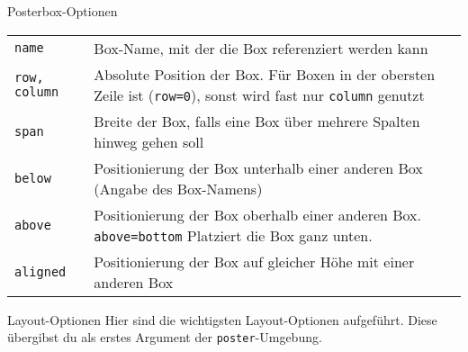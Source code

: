 \documentclass[
  a0paper,
  portrait,
  fontscale=.35 %
  ]{baposterrptu}
\begin{document}
\begin{poster}
\begin{posterbox}[below=poster-optionen, column=0]{Posterbox-Optionen}
    \begin{center}
      \begin{tabular}{lp{}}
        \lstinline!name!        & Box-Name, mit der die Box referenziert werden kann                                                                                 \\
        \lstinline!row, column! & Absolute Position der Box. Für Boxen in der obersten Zeile ist (\lstinline!row=0!), sonst wird fast nur \lstinline!column! genutzt \\
        \lstinline!span!        & Breite der Box, falls eine Box über mehrere Spalten hinweg gehen soll                                                              \\
        \lstinline!below!       & Positionierung der Box unterhalb einer anderen Box (Angabe des Box-Namens)                                                         \\
        \lstinline!above!       & Positionierung der Box oberhalb einer anderen Box. \lstinline!above=bottom! Platziert die Box ganz unten.                          \\
        \lstinline!aligned!     & Positionierung der Box auf gleicher Höhe mit einer anderen Box
      \end{tabular}
    \end{center}

  \end{posterbox}

  \begin{posterbox}[name=layout, below=farben, column=1]{Layout-Optionen}
    Hier sind die wichtigsten Layout-Optionen aufgeführt. Diese übergibst du als erstes Argument der \lstinline!poster!-Umgebung.


\end{posterbox}
\end{poster}
\end{document}
